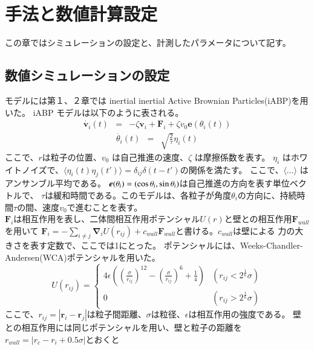 \documentclass[/Users/ikedahajime/GitHub/reserch/master_report/thesis]{subfiles}
\begin{document}
\chapter{手法と数値計算設定}
この章ではシミュレーションの設定と、計測したパラメータについて記す。
\section{数値シミュレーションの設定}
モデルには第１、２章では inertial inertial Active Brownian Particles(iABP)を用いた。
iABP モデルは以下のように表される。
\begin{eqnarray}
    \dot{\bm{v}_i}(t)&=& - \zeta \bm{v}_i  +\bm{F}_i +\zeta v_0 \bm{e}(\theta_i(t))
\end{eqnarray}
\begin{eqnarray}
    \dot{\theta_i }(t) &=& \sqrt{\frac{2}{\tau}}\eta_i(t)
\end{eqnarray}
ここで、\mbox{\boldmath$r$}は粒子の位置、$v_0$ は自己推進の速度、$\zeta$ は摩擦係数を表す。
$\eta_i$ はホワイトノイズで、$\langle \eta_i(t) \eta_j(t') \rangle=\delta_{ij}\delta(t-t')$の関係を満たす。
ここで、$\langle \dots \rangle$ はアンサンブル平均である。
$\mbox{\boldmath$e$}(\theta_i)=(\cos\theta_i,\sin \theta_i)$は自己推進の方向を表す単位ベクトルで、
$\tau$は緩和時間である。このモデルは、各粒子が角度$\theta_i$の方向に、持続時間$\tau$の間、速度$v_0$で進むことを表す。\\
$\bm{F}_i$は相互作用を表し、二体間相互作用ポテンシャル$U(r)$と壁との相互作用$\bm{F}_{wall}$を用いて
$\bm{F}_i=-\sum_{i\neq j} \bm{\nabla}_iU(r_{ij})+c_{wall}\bm{F}_{wall}$と書ける。$c_{wall}$は壁による
力の大きさを表す定数で、ここでは1にとった。
ポテンシャルには、Weeks-Chandler-Andersen(WCA)ポテンシャル\cite{weeksRoleRepulsiveForces1971}を用いた。
\begin{equation}
    U(r_{ij})=
    \begin{cases}
        4\epsilon\left(\left(\frac{\sigma}{r_{ij}}\right)^{12}-\left(\frac{\sigma}{r_{ij}}\right)^6+\frac{1}{4}\right) & (r_{ij}<2^{\frac{1}{6}}\sigma)\\
        0 &(r_{ij}>2^{\frac{1}{6}}\sigma)
    \end{cases}
\end{equation}
ここで、$r_{ij}=\left|\bm{r}_i-\bm{r}_j\right|$は粒子間距離、$\sigma$は粒径、$\epsilon$は相互作用の強度である。
壁との相互作用には同じポテンシャルを用い、壁と粒子の距離を$r_{wall}=\left|r_c-r_i+0.5\sigma\right|$とおくと%
\end{document}
